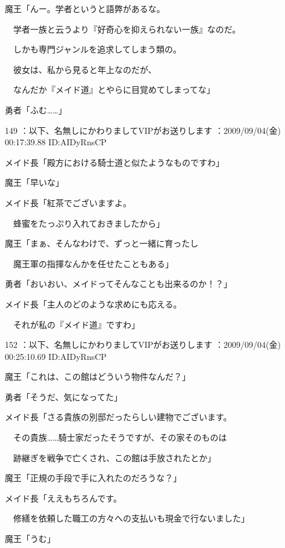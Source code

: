 \documentclass[a4j,twocolumn]{tarticle}
\begin{document}
魔王「んー。学者というと語弊があるな。\par{} 
　学者一族と云うより『好奇心を抑えられない一族』なのだ。\par{} 
　しかも専門ジャンルを追求してしまう類の。\par{} 
　彼女は、私から見ると年上なのだが、\par{} 
　なんだか『メイド道』とやらに目覚めてしまってな」 



勇者「ふむ……」 

	
    
    

149 ：以下、名無しにかわりましてVIPがお送りします ：2009/09/04(金) 00:17:39.88 ID:AIDyRnsCP 


メイド長「殿方における騎士道と似たようなものですわ」\par{} 
魔王「早いな」 



メイド長「紅茶でございますよ。\par{} 
　蜂蜜をたっぷり入れておきましたから」 



魔王「まぁ、そんなわけで、ずっと一緒に育ったし\par{} 
　魔王軍の指揮なんかを任せたこともある」\par{} 
勇者「おいおい、メイドってそんなことも出来るのか！？」 



メイド長「主人のどのような求めにも応える。\par{} 
　それが私の『メイド道』ですわ」 

	
    
    

152 ：以下、名無しにかわりましてVIPがお送りします ：2009/09/04(金) 00:25:10.69 ID:AIDyRnsCP 


魔王「これは、この館はどういう物件なんだ？」\par{} 
勇者「そうだ、気になってた」\par{} 
メイド長「さる貴族の別邸だったらしい建物でございます。\par{} 
　その貴族……騎士家だったそうですが、その家そのものは\par{} 
　跡継ぎを戦争で亡くされ、この館は手放されたとか」\par{} 
魔王「正規の手段で手に入れたのだろうな？」 



メイド長「ええもちろんです。\par{} 
　修繕を依頼した職工の方々への支払いも現金で行ないました」\par{} 
魔王「うむ」 
\end{document}
